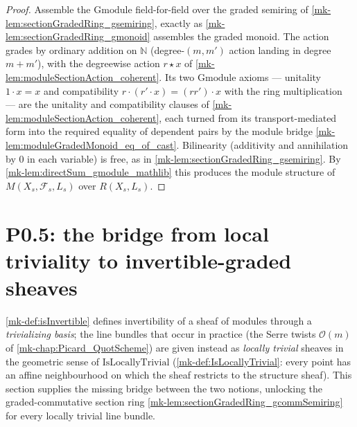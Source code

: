\begin{proof}
  \leanok
    Assemble the \(\mathrm{Gmodule}\) field-for-field over the graded semiring of
  \ref{mk-lem:sectionGradedRing_gsemiring}, exactly as
  \ref{mk-lem:sectionGradedRing_gmonoid} assembles the graded monoid. The action grades
  by ordinary addition on \(\mathbb{N}\) (degree-\((m,m')\) action landing in degree
  \(m+m'\)), with the degreewise action \(r\star x\) of
  \ref{mk-lem:moduleSectionAction_coherent}. Its two \(\mathrm{Gmodule}\) axioms ---
  unitality \(1 \cdot x = x\) and compatibility \(r \cdot (r' \cdot x) = (rr')\cdot x\)
  with the ring multiplication --- are the unitality and compatibility clauses of
  \ref{mk-lem:moduleSectionAction_coherent}, each turned from its transport-mediated
  form into the required equality of dependent pairs by the module bridge
  \ref{mk-lem:moduleGradedMonoid_eq_of_cast}. Bilinearity (additivity and annihilation by
  \(0\) in each variable) is free, as in \ref{mk-lem:sectionGradedRing_gsemiring}. By
  \ref{mk-lem:directSum_gmodule_mathlib} this produces the module structure of
  \(M(X_s,\mathcal{F}_s,L_s)\) over \(R(X_s,L_s)\).
\end{proof}

\section{P0.5: the bridge from local triviality to invertible-graded sheaves}
\label{mk-sec:sgr_invertibleGr_bridge}

\ref{mk-def:isInvertible} defines invertibility of a sheaf of modules through
a \emph{trivializing basis}; the line bundles that occur in practice (the
Serre twists \(\mathcal{O}(m)\) of \ref{mk-chap:Picard_QuotScheme}) are given
instead as \emph{locally trivial} sheaves in the geometric sense of
\(\mathrm{IsLocallyTrivial}\) (\ref{mk-def:IsLocallyTrivial}: every point has
an affine neighbourhood on which the sheaf restricts to the structure
sheaf). This section supplies the missing bridge between the two notions,
unlocking the graded-commutative section ring
\ref{mk-lem:sectionGradedRing_gcommSemiring} for every locally trivial line
bundle.

